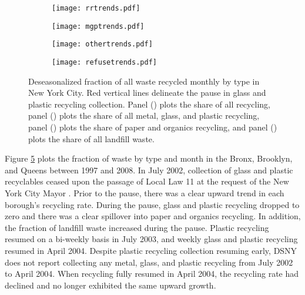 \documentclass[12pt]{article}
\begin{document}
\begin{figure}
\centering
\begin{subfigure}[c]{.49\textwidth}
    \centering 
    \texttt{[image: rrtrends.pdf]}
            \caption{}\label{fig:rrtrends}
    \end{subfigure}
\begin{subfigure}[c]{.49\textwidth}
    \centering
    \texttt{[image: mgptrends.pdf]}
        \caption{}\label{fig:mgptrends}
\end{subfigure}

\medskip

\begin{subfigure}[c]{.49\textwidth}
    \centering
    \vspace{0pt}
    \texttt{[image: othertrends.pdf]}
        \caption{}\label{fig:othertrends}
\end{subfigure}
\begin{subfigure}[c]{.49\textwidth}
    \centering
    \texttt{[image: refusetrends.pdf]}
        \caption{}\label{fig:refusetrends}
\end{subfigure}
    \caption{Deseasonalized fraction of all waste recycled monthly by type in New York City.  Red vertical lines delineate the pause in glass and plastic recycling collection.  Panel () plots the share of all recycling, panel () plots the share of all metal, glass, and plastic recycling, panel () plots the share of paper and organics recycling, and panel () plots the share of all landfill waste. } \label{fig:trends}
\end{figure}

Figure \ref{fig:trends} plots the fraction of waste by type and month in the Bronx, Brooklyn, and Queens between 1997 and 2008.  In July 2002, collection of glass and plastic recyclables ceased upon the passage of Local Law 11 at the request of the New York City Mayor \citep{macbride2004}.  Prior to the pause, there was a clear upward trend in each borough's recycling rate. During the pause, glass and plastic recycling dropped to zero and there was a clear spillover into paper and organics recycling.  In addition, the fraction of landfill waste increased during the pause. Plastic recycling resumed on a bi-weekly basis in July 2003, and weekly glass and plastic recycling resumed in April 2004.  Despite plastic recycling collection resuming early, DSNY does not report collecting any metal, glass, and plastic recycling from July 2002 to April 2004.  When recycling fully resumed in April 2004, the recycling rate had declined and no longer exhibited the same upward growth.
\end{document}
